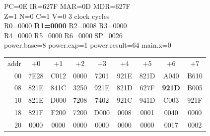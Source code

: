 \begin{tcolorbox}[stepbox, title={Step 29 \hfill PC 0D \quad ADDI R1, R1, -1}]
PC=0E IR=627F MAR=0D MDR=627F\\
Z=1 N=0 C=1 V=0 \hfill \textcolor{dim}{3 clock cycles}\\
R0=0000 \textcolor{wrt}{\textbf{R1=0000}} R2=0008 R3=0000\\
R4=0000 R5=0000 R6=0000 SP=0026\\
\textcolor{dim}{power.base=8  power.exp=1  power.result=64  main.x=0}\\[1pt]
{\setlength{\tabcolsep}{1.6pt}\begin{tabular}{@{}r*{8}{c}@{}}
\textcolor{dim}{addr} & \textcolor{dim}{+0} & \textcolor{dim}{+1} & \textcolor{dim}{+2} & \textcolor{dim}{+3} & \textcolor{dim}{+4} & \textcolor{dim}{+5} & \textcolor{dim}{+6} & \textcolor{dim}{+7}\\
\textcolor{dim}{00} & 7E28 & C012 & 0000 & 7201 & 921E & 821D & A040 & B610\\
\textcolor{dim}{08} & 821E & 841C & 3250 & 921E & 821D & 627F & \cellcolor{pcc}\textbf{921D} & B005\\
\textcolor{dim}{10} & 821E & D000 & 7208 & 7402 & 921C & 941D & C003 & 921F\\
\textcolor{dim}{18} & 821F & F200 & 7200 & D000 & \cellcolor{datac}0008 & \cellcolor{datac}0001 & \cellcolor{datac}0040 & \cellcolor{datac}0000\\
\textcolor{dim}{20} & \cellcolor{stackc}0000 & \cellcolor{stackc}0000 & \cellcolor{stackc}0000 & \cellcolor{stackc}0000 & \cellcolor{stackc}0000 & \cellcolor{stackc}0000 & \cellcolor{stackc}0017 & \cellcolor{stackc}0002\\
\end{tabular}}
\end{tcolorbox}\par\vspace{3pt}
